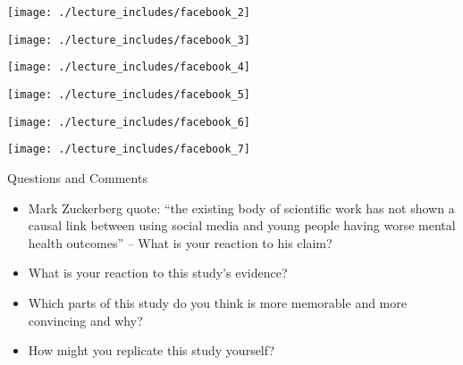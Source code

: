 \documentclass{beamer}
\begin{document}
\begin{frame}
\begin{center}
\texttt{[image: ./lecture\_includes/facebook\_2]}
\end{center}
\end{frame}

\begin{frame}
\begin{center}
\texttt{[image: ./lecture\_includes/facebook\_3]}
\end{center}
\end{frame}

\begin{frame}
\begin{center}
\texttt{[image: ./lecture\_includes/facebook\_4]}
\end{center}
\end{frame}

\begin{frame}
\begin{center}
\texttt{[image: ./lecture\_includes/facebook\_5]}
\end{center}
\end{frame}

\begin{frame}
\begin{center}
\texttt{[image: ./lecture\_includes/facebook\_6]}
\end{center}
\end{frame}

\begin{frame}
\begin{center}
\texttt{[image: ./lecture\_includes/facebook\_7]}
\end{center}
\end{frame}

\begin{frame}{Questions and Comments}

\begin{itemize}
\item Mark Zuckerberg quote: ``the existing body of scientific work has not shown a causal link between using social media and young people having worse mental health outcomes'' -- What is your reaction to his claim?
\item What is your reaction to this study's evidence?  
\item Which parts of this study do you think is more memorable and more convincing and why?
\item How might you replicate this study yourself?

\end{itemize}

\end{frame}
\end{document}
